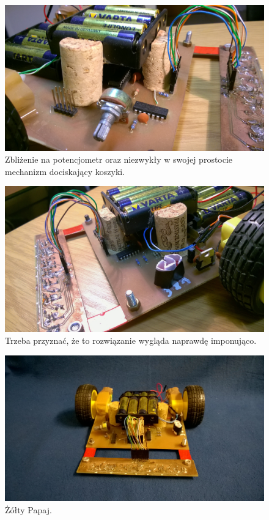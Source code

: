 \documentclass{article}
\begin{document}
\begin{figure}[!htbp]
\centering
\includegraphics[scale=0.12]{./focie/bok_prawy.jpg}
\caption{Zbliżenie na potencjometr oraz niezwykły w swojej prostocie mechanizm dociskający koszyki.}
\end{figure}

\begin{figure}[!htbp]
\centering
\includegraphics[scale=0.12]{./focie/bok_lewy.jpg}
\caption{Trzeba przyznać, że to rozwiązanie wygląda naprawdę imponująco.}
\end{figure}

\begin{figure}[!htbp]
\centering
\includegraphics[scale=0.12]{./focie/zolty_papaj.jpg}
\caption{Żółty Papaj.}
\end{figure}

\newpage


\end{document}
